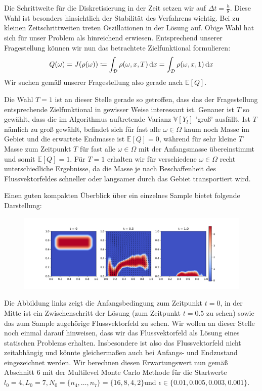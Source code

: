 Die Schrittweite für die Diskretisierung in der Zeit setzen wir auf $ \Delta t = \frac{h}{8} $. Diese Wahl ist besonders hinsichtlich der Stabilität des Verfahrens wichtig. Bei zu kleinen Zeitschrittweiten treten Oszillationen in der Lösung auf. Obige Wahl hat sich für unser Problem als hinreichend erwiesen.
Entsprechend unserer Fragestellung können wir nun das betrachtete Zielfunktional formulieren:
\[
Q(\omega) = J(\rho(\omega)) \coloneqq \int_{\mathcal{D}} \rho(\omega,x,T) \, \mathrm{d} x = \int_{\mathcal{D}} \rho(\omega,x,1) \, \mathrm{d} x
\]
Wir suchen gemäß unserer Fragestellung also gerade nach $ \mathbb{E}[Q] $.
\begin{Bemerkung2}\label{wahlfunk}
	Die Wahl $ T=1 $ ist an dieser Stelle gerade so getroffen, dass das der Fragestellung entsprechende Zielfunktional in gewisser Weise interessant ist. 
	Genauer ist $ T $ so gewählt, dass die im Algorithmus auftretende Varianz $ \mathbb{V}[Y_l] $ 'groß' ausfällt. Ist $ T $ nämlich zu groß gewählt, befindet sich für fast alle $ \omega \in \Omega $ kaum noch Masse im Gebiet und die erwartete Endmasse ist $ \mathbb{E}[Q] = 0 $, während für sehr kleine $ T $ Masse zum Zeitpunkt $ T $ für fast alle $ \omega \in \Omega $ mit der Anfangsmasse übereinstimmt und somit $ \mathbb{E}[Q] = 1$. Für $ T = 1 $ erhalten wir für verschiedene $ \omega \in \Omega $ recht unterschiedliche Ergebnisse, da die Masse je nach Beschaffenheit des Flussvektorfeldes schneller oder langsamer durch das Gebiet transportiert wird. 
\end{Bemerkung2}
Einen guten kompakten Überblick über ein einzelnes Sample bietet folgende Darstellung:
\begin{figure}[H]
	\centering
	\includegraphics[width=\textwidth]{plots/solution3.png} 
\end{figure}
Die Abbildung links zeigt die Anfangsbedingung zum Zeitpunkt $ t=0 $, in der Mitte ist ein Zwischenschritt der Lösung (zum Zeitpunkt $ t=0.5 $ zu sehen) sowie das zum Sample zugehörige Flussvektorfeld zu sehen. Wir wollen an dieser Stelle noch einmal darauf hinweisen, dass wir das Flussvektorfeld als Lösung eines statischen Problems erhalten. Insbesondere ist also das Flussvektorfeld nicht zeitabhängig und könnte gleichermaßen auch bei Anfangs- und Endzustand eingezeichnet werden. 
Wir berechnen diesen Erwartungswert nun gemäß Abschnitt 6 mit der Multilevel Monte Carlo Methode für die Startwerte $ l_0 = 4, L_0 = 7, N_0 = \{n_4,\dots,n_7\} = \{16,8,4,2\} $und $ \epsilon \in \{0.01,0.005,0.003,0.001\} $.
